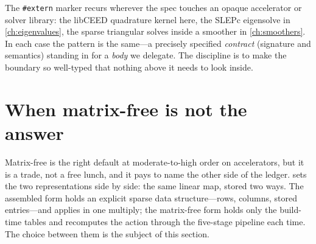 \begin{notationbox}
The \lstinline[style=l4style]|#extern| marker recurs wherever the spec touches an
opaque accelerator or solver library: the libCEED quadrature kernel here, the
SLEPc eigensolve in \cref{ch:eigenvalues}, the sparse triangular solves inside a
smoother in \cref{ch:smoothers}. In each case the pattern is the same---a
precisely specified \emph{contract} (signature and semantics) standing in for a
\emph{body} we delegate. The discipline is to make the boundary so well-typed that
nothing above it needs to look inside.
\end{notationbox}

\section{When matrix-free is not the answer}
\label{sec:mf-tradeoffs}

Matrix-free is the right default at moderate-to-high order on accelerators, but it
is a trade, not a free lunch, and it pays to name the other side of the ledger.
 sets the two representations side by side: the same
linear map, stored two ways. The assembled form holds an explicit sparse data
structure---rows, columns, stored entries---and applies in one multiply; the
matrix-free form holds only the build-time tables and recomputes the action
through the five-stage pipeline each time. The choice between them is the subject
of this section.

